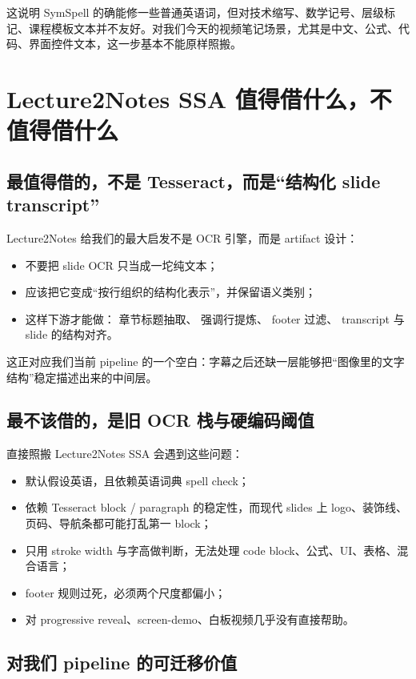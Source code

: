 \documentclass[a4paper]{article}
\begin{document}
这说明 SymSpell 的确能修一些普通英语词，但对技术缩写、数学记号、层级标记、课程模板文本并不友好。对我们今天的视频笔记场景，尤其是中文、公式、代码、界面控件文本，这一步基本不能原样照搬。

\section{Lecture2Notes SSA 值得借什么，不值得借什么}

\subsection{最值得借的，不是 Tesseract，而是“结构化 slide transcript”}

Lecture2Notes 给我们的最大启发不是 OCR 引擎，而是 artifact 设计：

\begin{itemize}
\item 不要把 slide OCR 只当成一坨纯文本；
\item 应该把它变成“按行组织的结构化表示”，并保留语义类别；
\item 这样下游才能做：
  章节标题抽取、
  强调行提炼、
  footer 过滤、
  transcript 与 slide 的结构对齐。
\end{itemize}

这正对应我们当前 pipeline 的一个空白：字幕之后还缺一层能够把“图像里的文字结构”稳定描述出来的中间层。

\subsection{最不该借的，是旧 OCR 栈与硬编码阈值}

直接照搬 Lecture2Notes SSA 会遇到这些问题：

\begin{itemize}
\item 默认假设英语，且依赖英语词典 spell check；
\item 依赖 Tesseract block / paragraph 的稳定性，而现代 slides 上 logo、装饰线、页码、导航条都可能打乱第一 block；
\item 只用 stroke width 与字高做判断，无法处理 code block、公式、UI、表格、混合语言；
\item footer 规则过死，必须两个尺度都偏小；
\item 对 progressive reveal、screen-demo、白板视频几乎没有直接帮助。
\end{itemize}

\subsection{对我们 pipeline 的可迁移价值}
\end{document}
